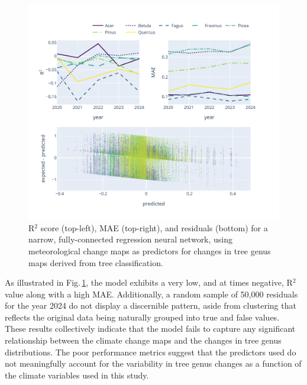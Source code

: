 \begin{figure}[ht]
    \centering
    \includegraphics[width=0.98\linewidth, trim={10pt 20pt 50pt 40pt}, clip]{figures/figures_climate/regression_results.pdf}
    \caption{R$^2$ score (top-left), MAE (top-right), and residuals (bottom) for a narrow, fully-connected regression neural network, using meteorological change maps as predictors for changes in tree genus maps derived from tree classification.}
    \label{fig:regression_results}
\end{figure}

As illustrated in Fig.\,\ref{fig:regression_results}, the model exhibits a very low, and at times negative, R$^2$ value along with a high MAE. Additionally, a random sample of 50,000 residuals for the year 2024 do not display a discernible pattern, aside from clustering that reflects the original data being naturally grouped into true and false values. These results collectively indicate that the model fails to capture any significant relationship between the climate change maps and the changes in tree genus distributions. The poor performance metrics suggest that the predictors used do not meaningfully account for the variability in tree genus changes as a function of the climate variables used in this study.